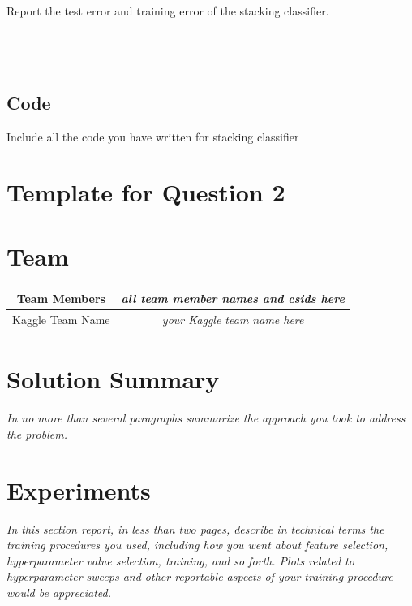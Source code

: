 Report the test error and training error of the stacking classifier.\\~\\~\\~\\

\subsection{Code}

Include all the code you have written for stacking classifier



\newpage

\section*{Template for Question 2}
\setcounter{section}{0}

\section{Team}
\begin{tabular}{|c | c |} 
\hline
Team Members & \emph{all team member names and csids here} \\
\hline
Kaggle Team Name & \emph{your Kaggle team name here}\\
\hline
\end{tabular}
\section{Solution Summary}
\emph{In no more than several paragraphs summarize the approach you took to address the problem.}
\section{Experiments}
\emph{In this section report, in less than two pages, describe in technical terms the training procedures you used, including how you went about feature selection, hyperparameter value selection, training, and so forth.  Plots related to hyperparameter sweeps and other reportable aspects of your training procedure would be appreciated.}




